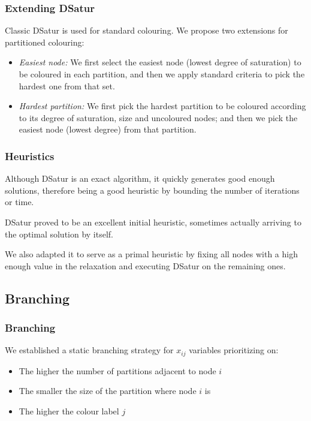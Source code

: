 \documentclass{beamer}
\begin{document}
\begin{frame}
\frametitle{Extending DSatur}

Classic DSatur is used for standard colouring. We propose two extensions for partitioned colouring:

\begin{itemize}

\item{\textit{Easiest node:} We first select the easiest node (lowest degree of saturation) to be coloured in each partition, and then we apply standard criteria to pick the hardest one from that set.}

\item{\textit{Hardest partition:} We first pick the hardest partition to be coloured according to its degree of saturation, size and uncoloured nodes; and then we pick the easiest node (lowest degree) from that partition.}

\end{itemize}

\end{frame} 

\begin{frame}
\frametitle{Heuristics}

Although DSatur is an exact algorithm, it quickly generates good enough solutions, therefore being a good heuristic by bounding the number of iterations or time.

DSatur proved to be an excellent initial heuristic, sometimes actually arriving to the optimal solution by itself.

We also adapted it to serve as a primal heuristic by fixing all nodes with a high enough value in the relaxation and executing DSatur on the remaining ones.

\end{frame} 

\subsection{Branching}
\begin{frame}
\frametitle{Branching}

We established a static branching strategy for $x_{ij}$ variables prioritizing on:

\begin{itemize}
\item{The higher the number of partitions adjacent to node $i$}
\item{The smaller the size of the partition where node $i$ is}
\item{The higher the colour label $j$}
\end{itemize}

\end{frame}
\end{document}

